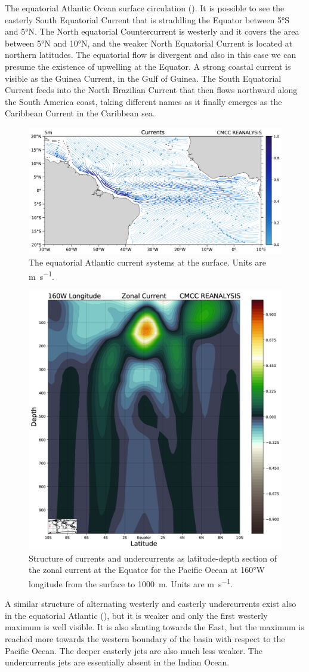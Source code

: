 The equatorial Atlantic Ocean surface circulation (\fig{\ref{fig:surface-current-equatorial-atlantic}}).
It is possible to see the easterly South Equatorial Current that is straddling the Equator between \ang{5}S and \ang{5}N.
The North equatorial Countercurrent is westerly and it covers the area between \ang{5}N
and \ang{10}N, and the weaker North Equatorial Current is located at northern
latitudes. The equatorial flow is divergent and also in this case we can
presume the existence of upwelling at the Equator. A strong coastal
current is visible as the Guinea Current, in the Gulf of Guinea. The
South Equatorial Current feeds into the North Brazilian Current that
then flows northward along the South America coast, taking different
names as it finally emerges as the Caribbean Current in the Caribbean
sea.
\begin{figure}
	\centering
	\includegraphics[width=0.45\linewidth]{figs/surface-current-equatorial-atlantic}
	\caption{The equatorial Atlantic current systems at the surface. Units are \unit{\meter \per \second}.}
	\label{fig:surface-current-equatorial-atlantic}
\end{figure}
\begin{figure}
	\centering
	\includegraphics[width=0.5\linewidth]{figs/section-zonal-current-160W}
	\caption{Structure of currents and undercurrents as latitude-depth section of the zonal current at the Equator for the Pacific Ocean at \ang{160}{W} longitude from the surface to \qty{1000}{m}.
		Units are \unit{\meter \per \second}.}
	\label{fig:section-zonal-current-160W}
\end{figure}
A similar structure of alternating westerly and easterly undercurrents
exist also in the equatorial Atlantic (\fig{\ref{fig:surface-current-equatorial-atlantic}}), but it
is weaker and only the first westerly maximum is well visible. It is
also slanting towards the East, but the maximum is reached more towards
the western boundary of the basin with respect to the Pacific Ocean. The
deeper easterly jets are also much less weaker. The undercurrents jets
are essentially absent in the Indian Ocean.


